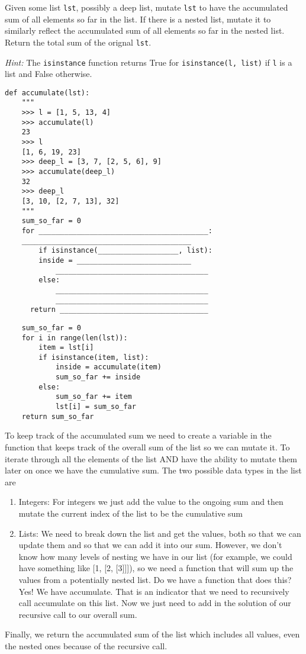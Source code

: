 \question Given some list \texttt{lst}, possibly a deep list, mutate \texttt{lst} to have the accumulated sum of all elements so far in the list. If there is a nested list, mutate it to similarly reflect the accumulated sum of all elements so far in the nested list. Return the total sum of the orignal \texttt{lst}.

\emph{Hint:} The \lstinline$isinstance$ function returns True for \lstinline$isinstance(l, list)$ if \texttt{l} is a list and False otherwise.

\begin{lstlisting}
def accumulate(lst):
    """
    >>> l = [1, 5, 13, 4]
    >>> accumulate(l)
    23
    >>> l
    [1, 6, 19, 23]
    >>> deep_l = [3, 7, [2, 5, 6], 9]
    >>> accumulate(deep_l)
    32
    >>> deep_l
    [3, 10, [2, 7, 13], 32]
    """
    sum_so_far = 0
    for ________________________________________:
	________________________________________
        if isinstance(___________________, list):
	    inside = ___________________________
            ____________________________________
        else:
            ____________________________________
            ____________________________________
      return ___________________________________
\end{lstlisting}

\begin{solution}[1in]
\begin{lstlisting}
    sum_so_far = 0
    for i in range(len(lst)):
        item = lst[i]
        if isinstance(item, list):
            inside = accumulate(item)
            sum_so_far += inside
        else:
            sum_so_far += item
            lst[i] = sum_so_far
    return sum_so_far
\end{lstlisting}
To keep track of the accumulated sum we need to create a variable in the function that keeps track of the overall sum of the list so we can mutate it. To iterate through all the elements of the list AND have the ability to mutate them later on once we have the cumulative sum. 
The two possible data types in the list are 
\begin{enumerate}
\item Integers:  For integers we just add the value to the ongoing sum and then mutate the current index of the list to be the cumulative sum
\item Lists: We need to break down the list and get the values, both so that we can update them and so that we can add it into our sum.  However, we don’t know how many levels of nesting we have in our list (for example, we could have something like [1, [2, [3]]]), so we need a function that will sum up the values from a potentially nested list.  Do we have a function that does this?  Yes!  We have accumulate.  That is an indicator that we need to recursively call accumulate on this list.  Now we just need to add in the solution of our recursive call to our overall sum.
\end{enumerate}
Finally, we return the accumulated sum of the list which includes all values, even the nested ones because of the recursive call. 

\end{solution}
